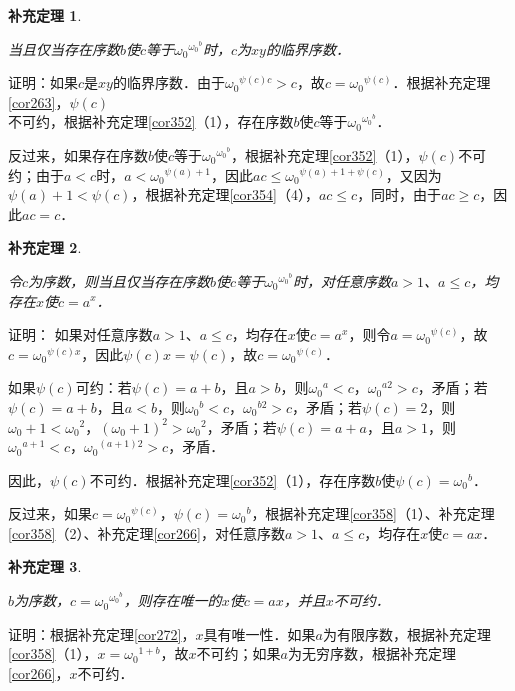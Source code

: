 \documentclass[12pt, a4paper, oneside]{book}
\newtheorem{cor}{补充定理}
\begin{document}
			\begin{cor}\label{cor362}
				\hfill\par
				当且仅当存在序数$b$使$c$等于${\omega_0}^{{\omega_0}^b}$时，$c$为$xy$的临界序数．
			\end{cor}
			证明：如果$c$是$xy$的临界序数．由于${\omega_0}^{\psi(c)c}>c$，故$c={\omega_0}^{\psi(c)}$．根据补充定理\ref{cor263}，$\psi(c)$\\不可约，根据补充定理\ref{cor352}（1），存在序数$b$使$c$等于${\omega_0}^{{\omega_0}^b}$．
			\par
			反过来，如果存在序数$b$使$c$等于${\omega_0}^{{\omega_0}^b}$，根据补充定理\ref{cor352}（1），$\psi(c)$不可约；由于$a<c$时，$a<{\omega_0}^{\psi(a)+1}$，因此$ac\leq {\omega_0}^{\psi(a)+1+\psi(c)}$，又因为$\psi(a)+1<\psi(c)$，根据补充定理\ref{cor354}（4），$ac\leq c$，同时，由于$ac\geq c$，因此$ac=c$．
			
			\begin{cor}\label{cor363}
				\hfill\par
				令$c$为序数，则当且仅当存在序数$b$使$c$等于${\omega_0}^{{\omega_0}^b}$时，对任意序数$a>1$、$a\leq c$，均存在$x$使$c=a^x$．
			\end{cor}
			证明：
			如果对任意序数$a>1$、$a\leq c$，均存在$x$使$c=a^x$，则令$a={\omega_0}^{\psi(c)}$，故$c={\omega_0}^{\psi(c)x}$，因此$\psi(c)x =\psi(c)$，故$c={\omega_0}^{\psi(c)}$．
			\par
			如果$\psi(c)$可约：若$\psi(c)=a+b$，且$a>b$，则${\omega_0}^a<c$，${\omega_0}^{a2}>c$，矛盾；若$\psi(c)=a+b$，且$a<b$，则${\omega_0}^b<c$，${\omega_0}^{b2}>c$，矛盾；若$\psi(c)=2$，则$\omega_0+1<{\omega_0}^2$，$(\omega_0+1)^2>{\omega_0}^2$，矛盾；若$\psi(c)=a+a$，且$a>1$，则${\omega_0}^{a+1}<c$，${\omega_0}^{(a+1)2}>c$，矛盾．
			\par
			因此，$\psi(c)$不可约．根据补充定理\ref{cor352}（1），存在序数$b$使$\psi(c)= {\omega_0}^b$．
			\par
			反过来，如果$c={\omega_0}^{\psi(c)}$，$\psi(c)= {\omega_0}^b$，根据补充定理\ref{cor358}（1）、补充定理\ref{cor358}（2）、补充定理\ref{cor266}，对任意序数$a>1$、$a\leq c$，均存在$x$使$c=ax$．
			
			\begin{cor}\label{cor364}
				\hfill\par
				$b$为序数，$c={\omega_0}^{{\omega_0}^b}$，则存在唯一的$x$使$c=ax$，并且$x$不可约．
			\end{cor}
			证明：根据补充定理\ref{cor272}，$x$具有唯一性．如果$a$为有限序数，根据补充定理\ref{cor358}（1），$x={\omega_0}^{1+b}$，故$x$不可约；如果$a$为无穷序数，根据补充定理\ref{cor266}，$x$不可约．
			
\end{document}
